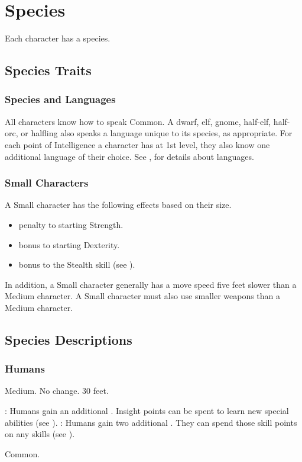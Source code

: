 \chapter{Species}\label{Species}

Each character has a species.

\section{Species Traits}

\subsection{Species and Languages}
All characters know how to speak Common. A dwarf, elf, gnome, half-elf, half-orc, or halfling also speaks a language unique to its species, as appropriate. For each point of Intelligence a character has at 1st level, they also know one additional language of their choice. See , for details about languages.

\subsection{Small Characters}\label{Small Characters}
A Small character has the following effects based on their size.
\begin{itemize}
    \item {} penalty to starting Strength.
    \item {} bonus to starting Dexterity.
    \item {} bonus to the Stealth skill (see ).
\end{itemize}

In addition, a Small character generally has a move speed five feet slower than a Medium character. A Small character must also use smaller weapons than a Medium character.

\section{Species Descriptions}

\subsection{Humans}
 Medium.
 No change.
 30 feet.
\begin{itemize}
    : Humans gain an additional .
        Insight points can be spent to learn new special abilities (see ).
    : Humans gain two additional . They can spend those skill points on any skills (see ).
\end{itemize}
 Common.

